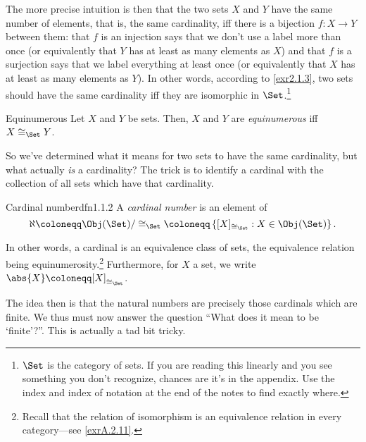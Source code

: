 The more precise intuition is then that the two sets $X$ and $Y$ have the same number of elements, that is, the same cardinality, iff there is a bijection $f\colon X\rightarrow Y$ between them:  that $f$ is an injection says that we don't use a label more than once (or equivalently that $Y$ has at least as many elements as $X$) and that $f$ is a surjection says that we label everything at least once (or equivalently that $X$ has at least as many elements as $Y$).  In other words, according to \cref{exr2.1.3}, two sets should have the same cardinality iff they are isomorphic in $\Set$.\footnote{$\Set$ is the category of sets.  If you are reading this linearly and you see something you don't recognize, chances are it's in the appendix.  Use the index and index of notation at the end of the notes to find exactly where.}
\begin{dfn}{Equinumerous}{}
Let $X$ and $Y$ be sets.  Then, $X$ and $Y$ are \emph{equinumerous} iff $X\cong _{\Set}Y$.
\end{dfn}

So we've determined what it means for two sets to have the same cardinality, but what actually \emph{is} a cardinality?  The trick is to identify a cardinal with the collection of all sets which have that cardinality.
\begin{dfn}{Cardinal number}{dfn1.1.2}
A \emph{cardinal number} is an element of
\begin{equation}
\aleph \coloneqq \Obj (\Set )/\cong _{\Set}\coloneqq \left\{ [X]_{\cong _{\Set}}:X\in \Obj (\Set )\right\} .
\end{equation}
\begin{rmk}
In other words, a cardinal is an equivalence class of sets, the equivalence relation being equinumerosity.\footnote{Recall that the relation of isomorphism is an equivalence relation in every category---see \cref{exrA.2.11}.}  Furthermore, for $X$ a set, we write $\abs{X}\coloneqq [X]_{\cong _{\Set}}$.
\end{rmk}
\end{dfn}

The idea then is that the natural numbers are precisely those cardinals which are finite.  We thus must now answer the question ``What does it mean to be `finite'?''.  This is actually a tad bit tricky.

